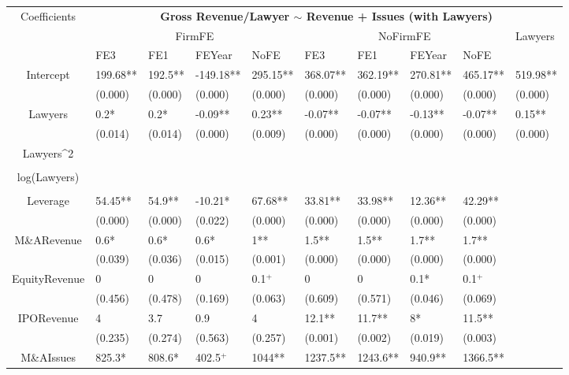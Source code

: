 \documentclass{article}
\begin{document}
\begin{table}[H]
\centering
\begin{tabular}{|clllllllll|}
\hline
\multirow{3}{*}{Coefficients} & \multicolumn{9}{c|}{\textbf{Gross Revenue/Lawyer $\sim$ Revenue + Issues (with Lawyers)}} \\
\cline{2-10}
& \multicolumn{4}{c}{FirmFE} & \multicolumn{4}{c}{NoFirmFE} & \multirow{2}{*}{Lawyers} \\
\cline{2-9}
& FE3 & FE1 & FEYear & NoFE & FE3 & FE1 & FEYear & NoFE &  \\
\hline
 
Intercept & 199.68** & 192.5** & -149.18** & 295.15** & 368.07** & 362.19** & 270.81** & 465.17** & 519.98** \\ 
   & (0.000) & (0.000) & (0.000) & (0.000) & (0.000) & (0.000) & (0.000) & (0.000) & (0.000) \\ 
  Lawyers & 0.2* & 0.2* & -0.09** & 0.23** & -0.07** & -0.07** & -0.13** & -0.07** & 0.15** \\ 
   & (0.014) & (0.014) & (0.000) & (0.009) & (0.000) & (0.000) & (0.000) & (0.000) & (0.000) \\ 
  Lawyers^2 &  &  &  &  &  &  &  &  &  \\ 
   &  &  &  &  &  &  &  &  &  \\ 
  log(Lawyers) &  &  &  &  &  &  &  &  &  \\ 
   &  &  &  &  &  &  &  &  &  \\ 
  Leverage & 54.45** & 54.9** & -10.21* & 67.68** & 33.81** & 33.98** & 12.36** & 42.29** &  \\ 
   & (0.000) & (0.000) & (0.022) & (0.000) & (0.000) & (0.000) & (0.000) & (0.000) &  \\ 
  M\&ARevenue & 0.6* & 0.6* & 0.6* & 1** & 1.5** & 1.5** & 1.7** & 1.7** &  \\ 
   & (0.039) & (0.036) & (0.015) & (0.001) & (0.000) & (0.000) & (0.000) & (0.000) &  \\ 
  EquityRevenue & 0 & 0 & 0 & 0.1$^{+}$ & 0 & 0 & 0.1* & 0.1$^{+}$ &  \\ 
   & (0.456) & (0.478) & (0.169) & (0.063) & (0.609) & (0.571) & (0.046) & (0.069) &  \\ 
  IPORevenue & 4 & 3.7 & 0.9 & 4 & 12.1** & 11.7** & 8* & 11.5** &  \\ 
   & (0.235) & (0.274) & (0.563) & (0.257) & (0.001) & (0.002) & (0.019) & (0.003) &  \\ 
  M\&AIssues & 825.3* & 808.6* & 402.5$^{+}$ & 1044** & 1237.5** & 1243.6** & 940.9** & 1366.5** &  \\ 

\end{tabular}
\end{table}
\end{document}

